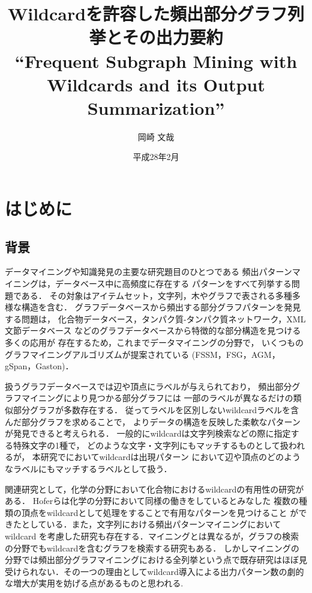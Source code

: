 \documentclass[12pt,fleqn]{jsotsuron}
\title{Wildcardを許容した頻出部分グラフ列挙とその出力要約\\
``Frequent Subgraph Mining with Wildcards and its Output Summarization''}
\author{岡崎 文哉}
\date{平成28年2月}
\begin{document}
\maketitle
\tableofcontents
\newpage

\chapter{はじめに}
\section{背景}
データマイニングや知識発見の主要な研究題目のひとつである
頻出パターンマイニングは，データベース中に高頻度に存在する
パターンをすべて列挙する問題である．
その対象はアイテムセット，文字列，木やグラフで表される多種多様な構造を含む．
グラフデータベースから頻出する部分グラフパターンを発見する問題は，
化合物データベース，タンパク質-タンパク質ネットワーク，XML文節データベース
などのグラフデータベースから特徴的な部分構造を見つける多くの応用が
存在するため，これまでデータマイニングの分野で，
いくつものグラフマイニングアルゴリズムが提案されている
(FSSM\cite{fssm}，FSG\cite{fsg}，AGM\cite{agm1,agm2}，
gSpan\cite{gSpan}，Gaston\cite{gaston})．

扱うグラフデータベースでは辺や頂点にラベルが与えられており，
頻出部分グラフマイニングにより見つかる部分グラフには
一部のラベルが異なるだけの類似部分グラフが多数存在する．
従ってラベルを区別しないwildcardラベルを含んだ部分グラフを求めることで，
よりデータの構造を反映した柔軟なパターンが発見できると考えられる．
一般的にwildcardは文字列検索などの際に指定する特殊文字の1種で，
どのような文字・文字列にもマッチするものとして扱われるが，
本研究でにおいてwildcardは出現パターン
において辺や頂点のどのようなラベルにもマッチするラベルとして扱う．

関連研究として，化学の分野において化合物におけるwildcardの有用性の研究がある．
Hoferら\cite{wildcard}は化学の分野において同様の働きをしているとみなした
複数の種類の頂点をwildcardとして処理をすることで有用なパターンを見つけること
ができたとしている．また，文字列における頻出パターンマイニングにおいてwildcard
を考慮した研究\cite{ws1,ws2,ws3}も存在する．マイニングとは異なるが，グラフの検索
\cite{graphgrep,graphfind}の分野でもwildcardを含むグラフを検索する研究もある．
しかしマイニングの分野では頻出部分グラフマイニングにおける全列挙という点で既存研究はほぼ見受けられない．その一つの理由としてwildcard導入による出力パターン数の劇的な増大が実用を妨げる点があるものと思われる.
\end{document}
